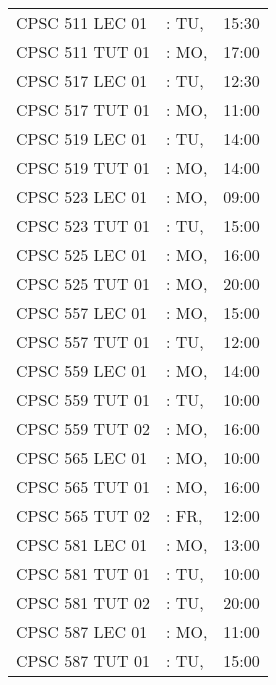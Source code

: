 \documentclass[11pt]{article}
\begin{document}
\begin{longtable}{l l r}
CPSC 511 LEC 01               &\hspace*{1.5cm}: TU,& 15:30\tabularnewline
CPSC 511 TUT 01               &\hspace*{1.5cm}: MO,& 17:00\tabularnewline
CPSC 517 LEC 01               &\hspace*{1.5cm}: TU,& 12:30\tabularnewline
CPSC 517 TUT 01               &\hspace*{1.5cm}: MO,& 11:00\tabularnewline
CPSC 519 LEC 01               &\hspace*{1.5cm}: TU,& 14:00\tabularnewline
CPSC 519 TUT 01               &\hspace*{1.5cm}: MO,& 14:00\tabularnewline
CPSC 523 LEC 01               &\hspace*{1.5cm}: MO,& 09:00\tabularnewline
CPSC 523 TUT 01               &\hspace*{1.5cm}: TU,& 15:00\tabularnewline
CPSC 525 LEC 01               &\hspace*{1.5cm}: MO,& 16:00\tabularnewline
CPSC 525 TUT 01               &\hspace*{1.5cm}: MO,& 20:00\tabularnewline
CPSC 557 LEC 01               &\hspace*{1.5cm}: MO,& 15:00\tabularnewline
CPSC 557 TUT 01               &\hspace*{1.5cm}: TU,& 12:00\tabularnewline
CPSC 559 LEC 01               &\hspace*{1.5cm}: MO,& 14:00\tabularnewline
CPSC 559 TUT 01               &\hspace*{1.5cm}: TU,& 10:00\tabularnewline
CPSC 559 TUT 02               &\hspace*{1.5cm}: MO,& 16:00\tabularnewline
CPSC 565 LEC 01               &\hspace*{1.5cm}: MO,& 10:00\tabularnewline
CPSC 565 TUT 01               &\hspace*{1.5cm}: MO,& 16:00\tabularnewline
CPSC 565 TUT 02               &\hspace*{1.5cm}: FR,& 12:00\tabularnewline
CPSC 581 LEC 01               &\hspace*{1.5cm}: MO,& 13:00\tabularnewline
CPSC 581 TUT 01               &\hspace*{1.5cm}: TU,& 10:00\tabularnewline
CPSC 581 TUT 02               &\hspace*{1.5cm}: TU,& 20:00\tabularnewline
CPSC 587 LEC 01               &\hspace*{1.5cm}: MO,& 11:00\tabularnewline
CPSC 587 TUT 01               &\hspace*{1.5cm}: TU,& 15:00\tabularnewline

\end{longtable}
\end{document}
